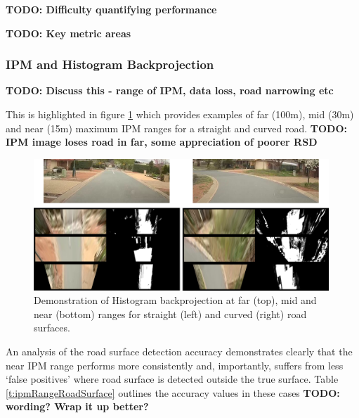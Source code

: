 \documentclass[]{aiaa-tc}%
\begin{document}
\textbf{TODO: Difficulty quantifying performance}

\textbf{TODO: Key metric areas}

\subsubsection{IPM and Histogram Backprojection}

\textbf{TODO: Discuss this - range of IPM, data loss, road narrowing etc}

This is highlighted in figure \ref{f:ipmHistogramResults} which provides examples of far (100m), mid (30m) and near (15m) maximum IPM ranges for a straight and curved road. \textbf{TODO: IPM image loses road in far, some appreciation of poorer RSD}

\begin{figure}{}
	\centering
	\includegraphics[width=0.99\textwidth]{Results/ipmHistogramResults.png}
	\caption{Demonstration of Histogram backprojection at far (top), mid and near (bottom) ranges for straight (left) and curved (right) road surfaces.}
	\label{f:ipmHistogramResults}
\end{figure}

An analysis of the road surface detection accuracy demonstrates clearly that the near IPM range performs more consistently and, importantly, suffers from less `false positives' where road surface is detected outside the true surface. Table \ref{t:ipmRangeRoadSurface} outlines the accuracy values in these cases \textbf{TODO: wording? Wrap it up better?}
\end{document}
